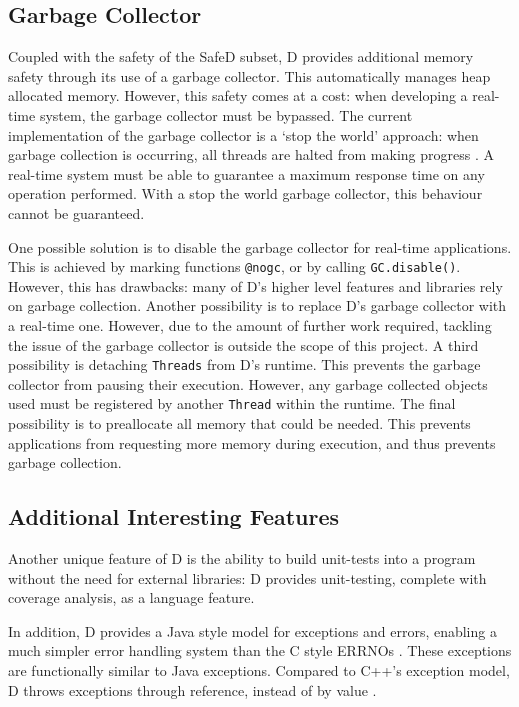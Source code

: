 \subsection{Garbage Collector}
Coupled with the safety of the SafeD subset, D provides additional memory
safety through its use of a garbage collector. This
automatically manages heap allocated memory. 
However, this safety comes at a cost:
when developing a real-time system, the garbage collector must be bypassed. 
The current implementation of the garbage 
collector is a `stop the world' approach: when garbage collection is occurring, 
all threads are halted from making progress 
\cite{dlang-garbage}. A real-time system must be able
to guarantee a maximum response time on any operation performed.
With a stop the world garbage collector, this behaviour cannot be guaranteed. 
\par\bigskip\noindent
One possible solution is to disable the garbage collector for 
real-time applications. This is achieved by marking functions \texttt{@nogc}, 
or by calling \texttt{GC.disable()}. However, this has drawbacks: 
many of D's higher level features and libraries rely on garbage collection. 
Another possibility is to replace D's garbage collector with a real-time 
one. However, due to the amount of 
further work required, tackling the issue of the garbage collector is outside the 
scope of this project.
A third possibility is
detaching \texttt{Threads} from D's runtime. This prevents the garbage collector from
pausing their execution. However, any garbage collected objects used must be registered
by another \texttt{Thread} within the runtime.
The final possibility is to preallocate all memory that could be needed. This 
prevents applications from requesting more memory during execution, and 
thus prevents garbage collection. 

\subsection{Additional Interesting Features}
Another unique feature of D is the ability to build unit-tests into a 
program without the need for external libraries: D provides 
unit-testing, complete with coverage analysis, as a language feature. 
\par\bigskip\noindent
In addition, D provides a Java style model for exceptions and errors, enabling 
a much simpler error handling system than the C style ERRNOs 
\cite{ddili-book}. 
These exceptions are functionally similar to Java exceptions. Compared to
C++'s exception model, D throws exceptions through reference, instead of by
value \cite{interface-to-cpp}. 


